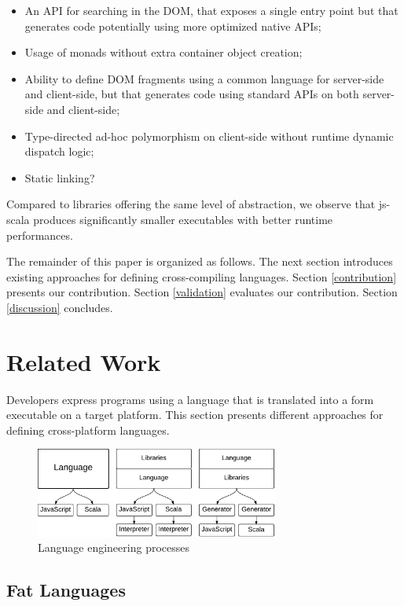 \documentclass[preprint]{sigplanconf}
\begin{document}
\begin{itemize}
 \item An API for searching in the DOM, that exposes a single entry point but that generates code potentially using
more optimized native APIs;
 \item Usage of monads without extra container object creation;
 \item Ability to define DOM fragments using a common language for server-side and client-side, but that generates
code using standard APIs on both server-side and client-side;
 \item Type-directed ad-hoc polymorphism on client-side without runtime dynamic dispatch logic;
 \item Static linking?
\end{itemize}

Compared to libraries offering the same level of abstraction, we observe that js-scala produces significantly smaller
executables with better runtime performances.

The remainder of this paper is organized as follows. The next section introduces existing approaches for defining
cross-compiling languages. Section \ref{contribution} presents our contribution. Section \ref{validation} evaluates
our contribution. Section \ref{discussion} concludes.

\section{Related Work}

Developers express programs using a language that is translated into a form executable on a target platform. This
section presents different approaches for defining cross-platform languages.

\begin{figure}
  \centering
  \includegraphics[width=8cm]{langs.pdf}
  \caption{Language engineering processes}
  \label{langs}
\end{figure}

\subsection{Fat Languages}
\end{document}
